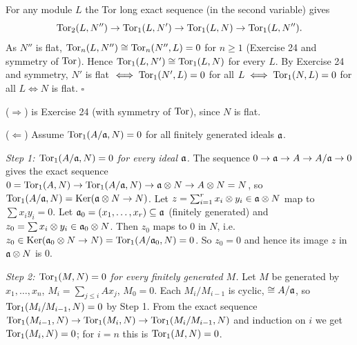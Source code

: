 \documentclass[11pt]{article}
\begin{document}
\pf
For any module $L$ the Tor long exact sequence (in the second variable) gives
\[
\operatorname{Tor}_2(L,N'')\to\operatorname{Tor}_1(L,N')\to\operatorname{Tor}_1(L,N)\to\operatorname{Tor}_1(L,N'').
\]
As $N''$ is flat, $\operatorname{Tor}_n(L,N'')\cong\operatorname{Tor}_n(N'',L)=0$ for $n\ge1$ (Exercise 24 and symmetry of $\operatorname{Tor}$). Hence $\operatorname{Tor}_1(L,N')\cong\operatorname{Tor}_1(L,N)$ for every $L$. By Exercise 24 and symmetry, $N'$ is flat $\iff\operatorname{Tor}_1(N',L)=0$ for all $L\iff\operatorname{Tor}_1(N,L)=0$ for all $L\iff N$ is flat. \hfill$\square$

\pf
($\Rightarrow$) is Exercise 24 (with symmetry of $\operatorname{Tor}$), since $N$ is flat.

($\Leftarrow$) Assume $\operatorname{Tor}_1(A/\mathfrak a,N)=0$ for all finitely generated ideals $\mathfrak a$.

\emph{Step 1: $\operatorname{Tor}_1(A/\mathfrak a,N)=0$ for every ideal $\mathfrak a$.} The sequence $0\to\mathfrak a\to A\to A/\mathfrak a\to0$ gives the exact sequence $0=\operatorname{Tor}_1(A,N)\to\operatorname{Tor}_1(A/\mathfrak a,N)\to\mathfrak a\otimes N\to A\otimes N=N$, so $\operatorname{Tor}_1(A/\mathfrak a,N)=\operatorname{Ker}(\mathfrak a\otimes N\to N)$. Let $z=\sum_{i=1}^rx_i\otimes y_i\in\mathfrak a\otimes N$ map to $\sum x_iy_i=0$. Let $\mathfrak a_0=(x_1,\dots,x_r)\subseteq\mathfrak a$ (finitely generated) and $z_0=\sum x_i\otimes y_i\in\mathfrak a_0\otimes N$. Then $z_0$ maps to $0$ in $N$, i.e.\ $z_0\in\operatorname{Ker}(\mathfrak a_0\otimes N\to N)=\operatorname{Tor}_1(A/\mathfrak a_0,N)=0$. So $z_0=0$ and hence its image $z$ in $\mathfrak a\otimes N$ is $0$.

\emph{Step 2: $\operatorname{Tor}_1(M,N)=0$ for every finitely generated $M$.} Let $M$ be generated by $x_1,\dots,x_n$, $M_i=\sum_{j\le i}Ax_j$, $M_0=0$. Each $M_i/M_{i-1}$ is cyclic, $\cong A/\mathfrak a$, so $\operatorname{Tor}_1(M_i/M_{i-1},N)=0$ by Step 1. From the exact sequence
$\operatorname{Tor}_1(M_{i-1},N)\to\operatorname{Tor}_1(M_i,N)\to\operatorname{Tor}_1(M_i/M_{i-1},N)$ and induction on $i$ we get $\operatorname{Tor}_1(M_i,N)=0$; for $i=n$ this is $\operatorname{Tor}_1(M,N)=0$.
\end{document}

